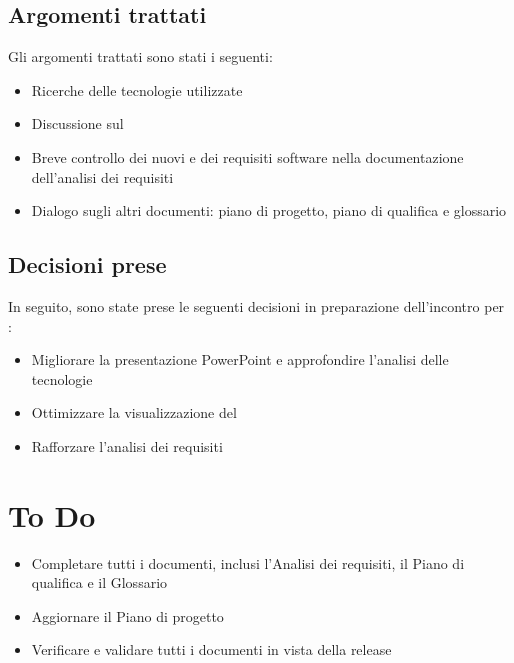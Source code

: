 \documentclass[a4paper, 12pt]{article}
\begin{document}
\subsection{Argomenti trattati}
Gli argomenti trattati sono stati i seguenti:
\begin{itemize}
    \item Ricerche delle tecnologie utilizzate
    \item Discussione sul  
    \item Breve controllo dei nuovi  e dei requisiti software nella documentazione dell'analisi dei requisiti
    \item Dialogo sugli altri documenti: piano di progetto, piano di qualifica e glossario
\end{itemize}

\subsection{Decisioni prese}
In seguito, sono state prese le seguenti decisioni in preparazione dell'incontro per :
\begin{itemize}
    \item Migliorare la presentazione PowerPoint e approfondire l'analisi delle tecnologie
    \item Ottimizzare la visualizzazione del  
    \item Rafforzare l’analisi dei requisiti
\end{itemize}

\section{To Do}
\begin{itemize}
    \item Completare tutti i documenti, inclusi l'Analisi dei requisiti, il Piano di qualifica e il Glossario
    \item Aggiornare il Piano di progetto
    \item Verificare e validare tutti i documenti in vista della release
\end{itemize}
\end{document}
